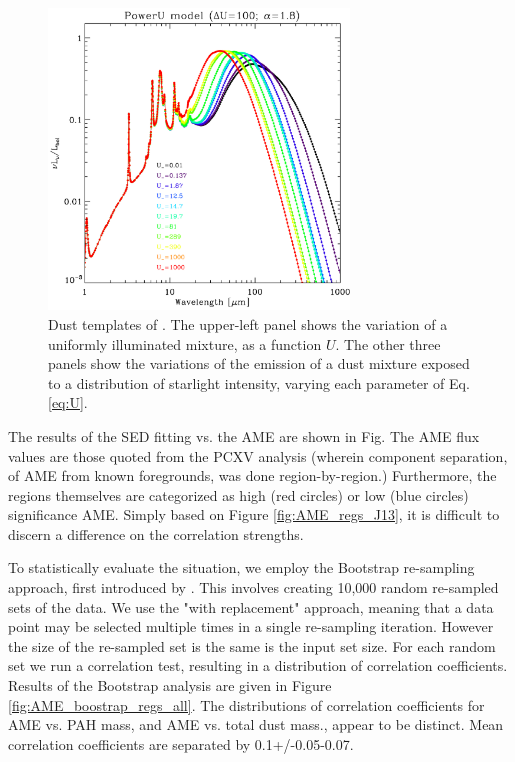 \documentclass[preprint2,longabstract]{aastex}
\begin{document}
\begin{figure}
  \includegraphics[width=80mm]{../Plots/template_powerU_Um_G11_AC.pdf}
  \centering
  \caption{Dust templates of \cite{galliano11}. The upper-left panel shows the variation of a uniformly illuminated mixture, as a function $U$. The other three panels show the variations of the emission of a dust mixture exposed to a distribution of starlight intensity, varying each parameter of Eq. \ref{eq:U}.  }
\end{figure}
    The results of the SED fitting vs. the AME are shown in Fig. The AME flux values are those quoted from the PCXV analysis (wherein component separation, of AME from known foregrounds, was done region-by-region.) Furthermore, the regions themselves are categorized as high (red circles) or low (blue circles) significance AME. Simply based on Figure \ref{fig:AME_regs_J13}, it is difficult to discern a difference on the correlation strengths.

     To statistically evaluate the situation, we employ the Bootstrap re-sampling approach, first introduced by \cite{efron79}. This involves creating 10,000 random re-sampled sets of the data. We use the "with replacement" approach, meaning that a data point may be selected multiple times in a single re-sampling iteration. However the size of the re-sampled set is the same is the input set size. For each random set we run a correlation test, resulting in a distribution of correlation coefficients. Results of the Bootstrap analysis are given in Figure \ref{fig:AME_boostrap_regs_all}. The distributions of correlation coefficients for AME vs. PAH mass, and AME vs. total dust mass., appear to be distinct. Mean correlation coefficients are separated by 0.1+/-0.05-0.07.

\end{document}
